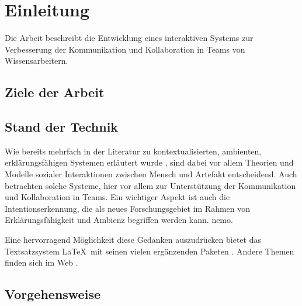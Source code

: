 \chapter{Einleitung}\label{chapter:introduction}


Die Arbeit beschreibt die Entwicklung eines interaktiven Systems zur Verbesserung der Kommunikation und Kollaboration in Teams von Wissensarbeitern.

\section{Ziele der Arbeit}\label{sec:goals}


\section{Stand der Technik}\label{sec:state_of_art}




Wie bereits mehrfach in der Literatur zu kontextualisierten, ambienten, erklärungsfähigen Systemen erläutert wurde \citep{Cassens-PhD-2008}, sind dabei vor allem Theorien und Modelle sozialer Interaktionen zwischen Mensch und Artefakt entscheidend. Auch \cite{Schmitt.ea-2010-mental_models_disappearing_systems} betrachten solche Systeme, hier vor allem zur Unterstützung der Kommunikation und Kollaboration in Teams. Ein wichtiger Aspekt ist auch die Intentionserkennung, die als neues Forschungsgebiet im Rahmen von Erklärungsfähigkeit und Ambienz begriffen werden kann. \citep{Kofod-Petersen.ea-2009-closed_doors} \gls{nemo}.

Eine hervorragend Möglichkeit diese Gedanken auszudrücken bietet das Textsatzsystem \LaTeX\ mit seinen vielen ergänzenden Paketen . Andere Themen finden sich im Web .

\section{Vorgehensweise}\label{sec:approach}



